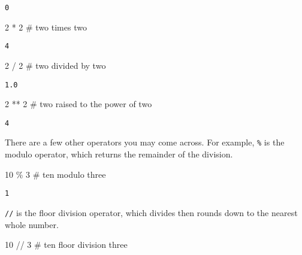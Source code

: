 \documentclass[
  letterpaper,
  DIV=11,
  numbers=noendperiod]{scrreprt}
\newenvironment{Shaded}{\begin{snugshade}}{\end{snugshade}}
\newcommand{\CommentTok}[1]{\textcolor[rgb]{0.37,0.37,0.37}{#1}}
\newcommand{\DecValTok}[1]{\textcolor[rgb]{0.68,0.00,0.00}{#1}}
\newcommand{\OperatorTok}[1]{\textcolor[rgb]{0.37,0.37,0.37}{#1}}
\begin{document}
\begin{verbatim}
0
\end{verbatim}

\begin{Shaded}
\begin{Highlighting}[]
\DecValTok{2} \OperatorTok{*} \DecValTok{2}  \CommentTok{\# two times two }
\end{Highlighting}
\end{Shaded}

\begin{verbatim}
4
\end{verbatim}

\begin{Shaded}
\begin{Highlighting}[]
\DecValTok{2} \OperatorTok{/} \DecValTok{2}  \CommentTok{\# two divided by two}
\end{Highlighting}
\end{Shaded}

\begin{verbatim}
1.0
\end{verbatim}

\begin{Shaded}
\begin{Highlighting}[]
\DecValTok{2} \OperatorTok{**} \DecValTok{2}  \CommentTok{\# two raised to the power of two}
\end{Highlighting}
\end{Shaded}

\begin{verbatim}
4
\end{verbatim}

There are a few other operators you may come across. For example,
\texttt{\%} is the modulo operator, which returns the remainder of the
division.

\begin{Shaded}
\begin{Highlighting}[]
\DecValTok{10} \OperatorTok{\%} \DecValTok{3}  \CommentTok{\# ten modulo three}
\end{Highlighting}
\end{Shaded}

\begin{verbatim}
1
\end{verbatim}

\texttt{//} is the floor division operator, which divides then rounds
down to the nearest whole number.

\begin{Shaded}
\begin{Highlighting}[]
\DecValTok{10} \OperatorTok{//} \DecValTok{3}  \CommentTok{\# ten floor division three}
\end{Highlighting}
\end{Shaded}
\end{document}
